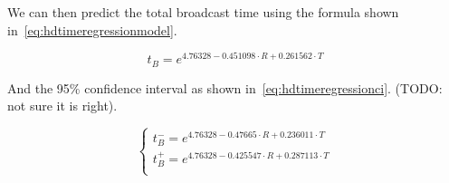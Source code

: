 We can then predict the total broadcast time using the formula shown
in~\eqref{eq:hdtimeregressionmodel}.

\begin{equation}\label{eq:hdtimeregressionmodel}
	t_B = e^{4.76328 - 0.451098 \cdot R + 0.261562 \cdot T}
\end{equation}

And the 95\% confidence interval as shown in~\eqref{eq:hdtimeregressionci}.
(TODO\@: not sure it is right).

\begin{equation}\label{eq:hdtimeregressionci}
	\begin{cases}
		t^-_B = e^{4.76328 - 0.47665 \cdot R + 0.236011 \cdot T}\\
		t^+_B = e^{4.76328 - 0.425547 \cdot R + 0.287113 \cdot T}\\
	\end{cases}
\end{equation}
